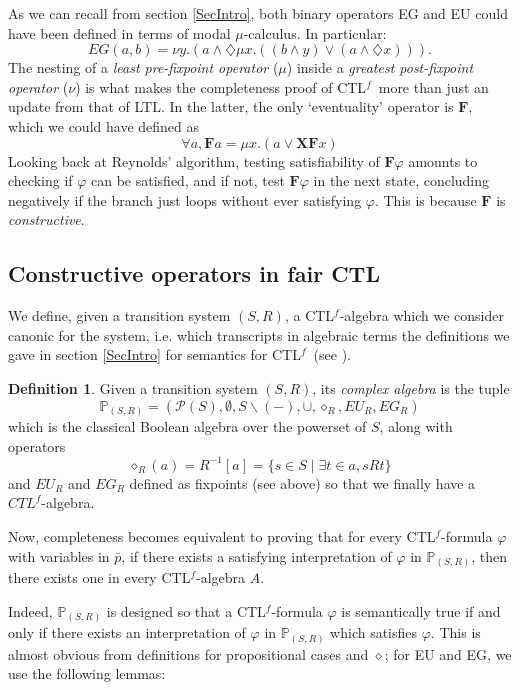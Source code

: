 \documentclass[11pt]{article}
\newcommand{\CTLf}{{CTL$^f$}}
\newcommand{\X}{{\mathbf{X}}}
\newcommand{\F}{{\mathbf{F}}}
\newcommand{\orr}{{\vee}}
\newcommand{\phii}{{\varphi}}
\newcommand{\dia}{{\diamondsuit}}
\theoremstyle{definition}
\newtheorem*{definition}{Definition}
\begin{document}
As we can recall from section \ref*{SecIntro}, both binary operators EG and EU could have been defined in terms of
modal $\mu$-calculus. In particular: \[EG(a,b)=\nu y.(a\wedge\dia\mu x.((b\wedge y)\vee(a\wedge\dia x))).\]
The nesting of a \emph{least pre-fixpoint operator} ($\mu$) inside a \emph{greatest post-fixpoint operator} ($\nu$)
is what makes the completeness proof of \CTLf~more than just an update from that of LTL. In the latter, the only `eventuality' operator is $\F$, which
we could have defined as \[\forall a, \F a = \mu x. (a\orr\X\F x)\] Looking back at Reynolds' algorithm, testing satisfiability
of $\F\phii$ amounts to checking if $\phii$ can be satisfied, and if not, test $\F\phii$ in the next state, concluding negatively if 
the branch just loops without ever satisfying $\phii$. This is because $\F$ is \emph{constructive}.

\subsection*{Constructive operators in fair CTL}

We define, given a transition system $(S,R)$, a \CTLf-algebra which we consider canonic for the system, i.e. which transcripts in algebraic
terms the definitions we gave in section \ref*{SecIntro} for semantics for \CTLf~(see \cite[Section 2]{GhivG16}).

\begin{definition}\label{complex_algebra}
    Given a transition system $(S,R)$, its \emph{complex algebra} is the tuple \[\mathbb{P}_{(S,R)}=(\mathcal{P}(S),\emptyset,S\backslash(-),\cup,\diamond_R,EU_R,EG_R)\] which is the classical Boolean algebra over the powerset of $S$, along with operators \[\diamond_R(a)=R^{-1}[a]=\{s\in S \mid \exists t\in a, sRt \}\] and $EU_R$ and $EG_R$ defined as fixpoints (see above) so that we finally have a $CTL^f$-algebra. 
\end{definition}

Now, completeness becomes equivalent to proving that for every \CTLf-formula $\phii$ with variables in $\bar{p}$, 
if there exists a satisfying interpretation of $\phii$ in $\mathbb{P}_{(S,R)}$, then there exists one in every \CTLf-algebra $A$.

Indeed, $\mathbb{P}_{(S,R)}$ is designed so that 
a \CTLf-formula $\phii$ is semantically true if and only if there exists an interpretation of $\phii$ in $\mathbb{P}_{(S,R)}$ which satisfies $\phii$.
This is almost obvious from definitions for propositional cases and $\diamond$; for EU and EG, we use the following lemmas:
\end{document}
